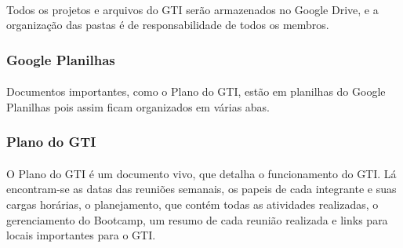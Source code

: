 \documentclass{article}
\begin{document}
\paragraph{}
Todos os projetos e arquivos do GTI serão armazenados no Google Drive, e a organização das pastas é de responsabilidade de todos os membros.

\subsubsection{Google Planilhas}
\paragraph{}
Documentos importantes, como o Plano do GTI, estão em planilhas do Google Planilhas pois assim ficam organizados em várias abas.
\subsubsection{Plano do GTI}
\paragraph{}
O Plano do GTI é um documento vivo, que detalha o funcionamento do GTI. Lá encontram-se as datas das reuniões semanais, os papeis de cada integrante e suas cargas horárias, o planejamento, que contém todas as atividades realizadas, o gerenciamento do Bootcamp, um resumo de cada reunião realizada e links para locais importantes para o GTI.
\end{document}
